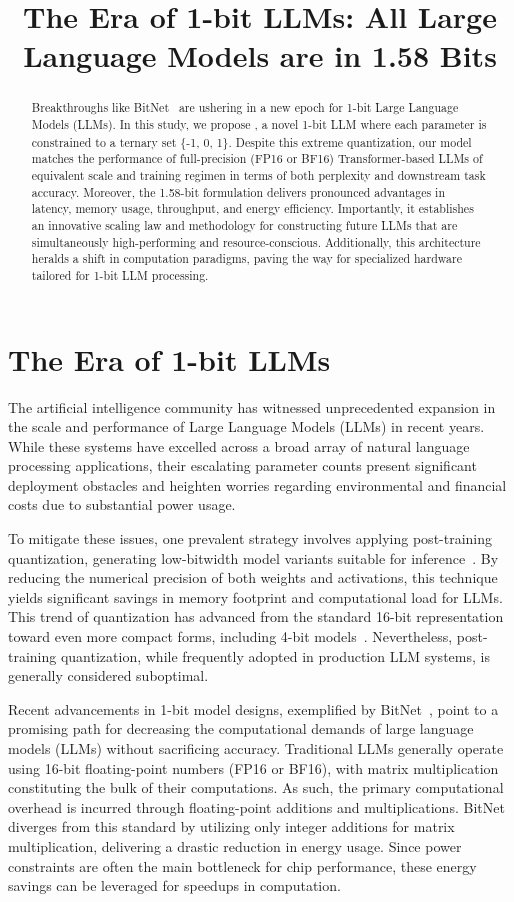 \title{The Era of 1-bit LLMs: All Large Language Models are in 1.58 Bits}

\begin{abstract}
Breakthroughs like BitNet~\cite{bitnet} are ushering in a new epoch for 1-bit Large Language Models (LLMs). In this study, we propose \textbf{}, a novel 1-bit LLM where each parameter is constrained to a ternary set \{-1, 0, 1\}. Despite this extreme quantization, our model matches the performance of full-precision (FP16 or BF16) Transformer-based LLMs of equivalent scale and training regimen in terms of both perplexity and downstream task accuracy. Moreover, the 1.58-bit formulation delivers pronounced advantages in latency, memory usage, throughput, and energy efficiency. Importantly, it establishes an innovative scaling law and methodology for constructing future LLMs that are simultaneously high-performing and resource-conscious. Additionally, this architecture heralds a shift in computation paradigms, paving the way for specialized hardware tailored for 1-bit LLM processing.
\end{abstract}

\section{The Era of 1-bit LLMs}

The artificial intelligence community has witnessed unprecedented expansion in the scale and performance of Large Language Models (LLMs) in recent years. While these systems have excelled across a broad array of natural language processing applications, their escalating parameter counts present significant deployment obstacles and heighten worries regarding environmental and financial costs due to substantial power usage.

To mitigate these issues, one prevalent strategy involves applying post-training quantization, generating low-bitwidth model variants suitable for inference~\cite{smoothquant, gptq, quip, quip_sharp}. By reducing the numerical precision of both weights and activations, this technique yields significant savings in memory footprint and computational load for LLMs. This trend of quantization has advanced from the standard 16-bit representation toward even more compact forms, including 4-bit models~\cite{gptq, awq}. Nevertheless, post-training quantization, while frequently adopted in production LLM systems, is generally considered suboptimal.

Recent advancements in 1-bit model designs, exemplified by BitNet~\cite{bitnet}, point to a promising path for decreasing the computational demands of large language models (LLMs) without sacrificing accuracy. Traditional LLMs generally operate using 16-bit floating-point numbers (FP16 or BF16), with matrix multiplication constituting the bulk of their computations. As such, the primary computational overhead is incurred through floating-point additions and multiplications. BitNet diverges from this standard by utilizing only integer additions for matrix multiplication, delivering a drastic reduction in energy usage. Since power constraints are often the main bottleneck for chip performance, these energy savings can be leveraged for speedups in computation.

